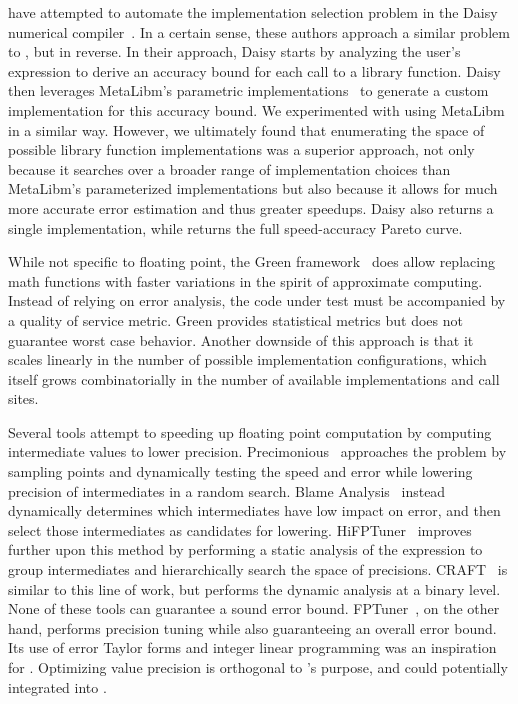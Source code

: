 \documentclass[paper.tex]{subfiles}
\begin{document}
\citet{daisy-libm} have attempted to automate
  the implementation selection problem
  in the Daisy numerical compiler~\cite{daisy}.
In a certain sense,
  these authors approach a similar problem to \name, but in reverse.
In their approach,
  Daisy starts by analyzing the user's expression
  to derive an accuracy bound for each call to a library function.
Daisy then leverages MetaLibm's
  parametric implementations~\cite{metalibm}
  to generate a custom implementation for this accuracy bound.
We experimented with using MetaLibm in a similar way.
However, we ultimately found that enumerating the space
  of possible library function implementations was a superior approach,
  not only because it searches over
  a broader range of implementation choices
  than MetaLibm's parameterized implementations
  but also because it allows for much more accurate error estimation
  and thus greater speedups.
Daisy also returns a single implementation,
  while \name returns the full speed-accuracy Pareto curve.

While not specific to floating point, the Green framework~\cite{green-frame}
  does allow replacing math functions with faster variations in the spirit of
  approximate computing.
Instead of relying on error analysis, the code under test must be accompanied
  by a quality of service metric.
Green provides statistical metrics but does not guarantee worst case behavior.
Another downside of this approach is that it scales linearly
  in the number of possible implementation configurations,
  which itself grows combinatorially in the number of available implementations and call sites.

Several tools attempt to
  speeding up floating point computation
  by computing intermediate values to lower precision.
Precimonious~\cite{precimonious} approaches the problem by sampling points and
  dynamically testing the speed and error while lowering precision of
  intermediates in a random search.
Blame Analysis~\cite{prec-blame}
  instead dynamically determines which intermediates have low impact on error,
  and then select those intermediates as candidates for lowering.
HiFPTuner~\cite{hifptuner} improves further upon this method
  by performing a static analysis of the expression
  to group intermediates and hierarchically search the space of precisions.
CRAFT~\cite{lam} is similar to this line of work,
  but performs the dynamic analysis at a binary level.
None of these tools can guarantee a sound error bound.
FPTuner~\cite{fptuner}, on the other hand, performs precision tuning
   while also guaranteeing an overall error bound.
Its use of error Taylor forms and integer linear programming
  was an inspiration for \name.
Optimizing value precision is orthogonal to \name's purpose,
  and could potentially integrated into \name.
\end{document}
